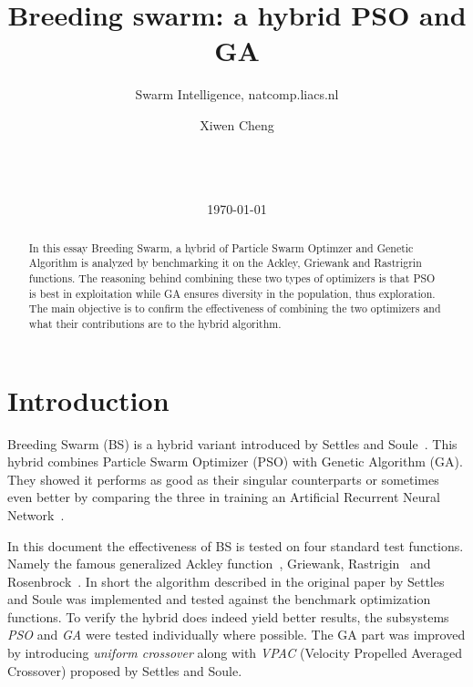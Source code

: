 \documentclass{acm_proc_article-sp}
\begin{document}
\title{Breeding swarm: a hybrid PSO and GA}
\subtitle{Swarm Intelligence, natcomp.liacs.nl}
\author{
\alignauthor
Xiwen Cheng\\
       \\
       \\
       \\
}
\date{\today}

\maketitle
\begin{abstract}
In this essay Breeding Swarm, a hybrid of Particle Swarm Optimzer and Genetic Algorithm is analyzed by benchmarking it on the Ackley, Griewank and Rastrigrin functions. The reasoning behind combining these two types of optimizers is that PSO is best in exploitation while GA ensures diversity in the population, thus exploration. The main objective is to confirm the effectiveness of combining the two optimizers and what their contributions are to the hybrid algorithm. 
\end{abstract}

\section{Introduction}
Breeding Swarm (BS) is a hybrid variant introduced by Settles and Soule~\cite{SET05}. This hybrid combines Particle Swarm Optimizer (PSO) with Genetic Algorithm (GA). They showed it performs as good as their singular counterparts or sometimes even better by comparing the three in training an Artificial Recurrent Neural Network~\cite{SET052}.

In this document the effectiveness of BS is tested on four standard test functions. Namely the famous generalized Ackley function~\cite{ACK87, BAC96}, Griewank\cite{LOC03}, Rastrigin~\cite{MUH91} and Rosenbrock~\cite{MUL73}. In short the algorithm described in the original paper by Settles and Soule was implemented and tested against the benchmark optimization functions. To verify the hybrid does indeed yield better results, the subsystems \emph{PSO} and \emph{GA} were tested individually where possible. The GA part was improved by introducing \emph{uniform crossover} along with \emph{VPAC} (Velocity Propelled Averaged Crossover) proposed by Settles and Soule.
\end{document}
